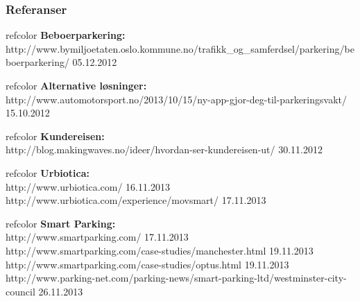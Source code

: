 \documentclass[xetex]{beamer}
\begin{document}
\begin{frame}\label{fr:referanser}
	\frametitle{Referanser}	
	\begin{beamercolorbox}[wd=1.0\textwidth, ht=2.8ex, dp=5pt, leftskip=.3cm, rightskip=.3cm]{refcolor}
    \tiny
    {\textbf{Beboerparkering:}}\\
	 {http://www.bymiljoetaten.oslo.kommune.no/trafikk\_og\_samferdsel/parkering/beboerparkering/ \hfill 05.12.2012}
	\end{beamercolorbox}
	
	\begin{beamercolorbox}[wd=1.0\textwidth, ht=2.8ex, dp=5pt, leftskip=.3cm, rightskip=.3cm]{refcolor}
    \tiny
    {\textbf{Alternative løsninger:}}\\
	 {http://www.automotorsport.no/2013/10/15/ny-app-gjor-deg-til-parkeringsvakt/ \hfill 15.10.2012}
	\end{beamercolorbox}
	
	\begin{beamercolorbox}[wd=1.0\textwidth, ht=2.8ex, dp=5pt, leftskip=.3cm, rightskip=.3cm]{refcolor}
    \tiny
    {\textbf{Kundereisen:}}\\
	 {http://blog.makingwaves.no/ideer/hvordan-ser-kundereisen-ut/ \hfill 30.11.2012}
	\end{beamercolorbox}
	
	\begin{beamercolorbox}[wd=1.0\textwidth, ht=3.6ex, dp=5pt, leftskip=.3cm, rightskip=.3cm]{refcolor}
    \tiny
    {\textbf{Urbiotica:}}\\
	 {http://www.urbiotica.com/ \hfill 16.11.2013\\
	 http://www.urbiotica.com/experience/movsmart/  \hfill 17.11.2013}
	\end{beamercolorbox}
	
	\begin{beamercolorbox}[wd=1.0\textwidth, ht=5ex, dp=10pt, leftskip=.3cm, rightskip=.3cm]{refcolor}
    \tiny
    {\textbf{Smart Parking:}}\\
	{http://www.smartparking.com/ \hfill 17.11.2013 \\
	http://www.smartparking.com/case-studies/manchester.html \hfill 19.11.2013 \\
	http://www.smartparking.com/case-studies/optus.html \hfill  19.11.2013 \\
	http://www.parking-net.com/parking-news/smart-parking-ltd/westminster-city-council \hfill 26.11.2013 \\}
	\end{beamercolorbox}
	

\end{frame}
\end{document}
